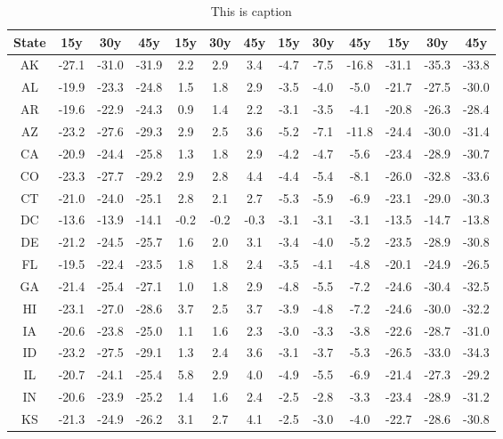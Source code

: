 \begin{table}
\centering
\caption{This is caption}
\label{tab:cola_table}
\begin{tabular}{ccccccccccccc}
\toprule
State &   15y &   30y &   45y &  15y &  30y &  45y &  15y &  30y &   45y &   15y &   30y &   45y \\
\midrule
   AK & -27.1 & -31.0 & -31.9 &  2.2 &  2.9 &  3.4 & -4.7 & -7.5 & -16.8 & -31.1 & -35.3 & -33.8 \\
   AL & -19.9 & -23.3 & -24.8 &  1.5 &  1.8 &  2.9 & -3.5 & -4.0 &  -5.0 & -21.7 & -27.5 & -30.0 \\
   AR & -19.6 & -22.9 & -24.3 &  0.9 &  1.4 &  2.2 & -3.1 & -3.5 &  -4.1 & -20.8 & -26.3 & -28.4 \\
   AZ & -23.2 & -27.6 & -29.3 &  2.9 &  2.5 &  3.6 & -5.2 & -7.1 & -11.8 & -24.4 & -30.0 & -31.4 \\
   CA & -20.9 & -24.4 & -25.8 &  1.3 &  1.8 &  2.9 & -4.2 & -4.7 &  -5.6 & -23.4 & -28.9 & -30.7 \\
   CO & -23.3 & -27.7 & -29.2 &  2.9 &  2.8 &  4.4 & -4.4 & -5.4 &  -8.1 & -26.0 & -32.8 & -33.6 \\
   CT & -21.0 & -24.0 & -25.1 &  2.8 &  2.1 &  2.7 & -5.3 & -5.9 &  -6.9 & -23.1 & -29.0 & -30.3 \\
   DC & -13.6 & -13.9 & -14.1 & -0.2 & -0.2 & -0.3 & -3.1 & -3.1 &  -3.1 & -13.5 & -14.7 & -13.8 \\
   DE & -21.2 & -24.5 & -25.7 &  1.6 &  2.0 &  3.1 & -3.4 & -4.0 &  -5.2 & -23.5 & -28.9 & -30.8 \\
   FL & -19.5 & -22.4 & -23.5 &  1.8 &  1.8 &  2.4 & -3.5 & -4.1 &  -4.8 & -20.1 & -24.9 & -26.5 \\
   GA & -21.4 & -25.4 & -27.1 &  1.0 &  1.8 &  2.9 & -4.8 & -5.5 &  -7.2 & -24.6 & -30.4 & -32.5 \\
   HI & -23.1 & -27.0 & -28.6 &  3.7 &  2.5 &  3.7 & -3.9 & -4.8 &  -7.2 & -24.6 & -30.0 & -32.2 \\
   IA & -20.6 & -23.8 & -25.0 &  1.1 &  1.6 &  2.3 & -3.0 & -3.3 &  -3.8 & -22.6 & -28.7 & -31.0 \\
   ID & -23.2 & -27.5 & -29.1 &  1.3 &  2.4 &  3.6 & -3.1 & -3.7 &  -5.3 & -26.5 & -33.0 & -34.3 \\
   IL & -20.7 & -24.1 & -25.4 &  5.8 &  2.9 &  4.0 & -4.9 & -5.5 &  -6.9 & -21.4 & -27.3 & -29.2 \\
   IN & -20.6 & -23.9 & -25.2 &  1.4 &  1.6 &  2.4 & -2.5 & -2.8 &  -3.3 & -23.4 & -28.9 & -31.2 \\
   KS & -21.3 & -24.9 & -26.2 &  3.1 &  2.7 &  4.1 & -2.5 & -3.0 &  -4.0 & -22.7 & -28.6 & -30.8 \\

\end{tabular}
\end{table}

